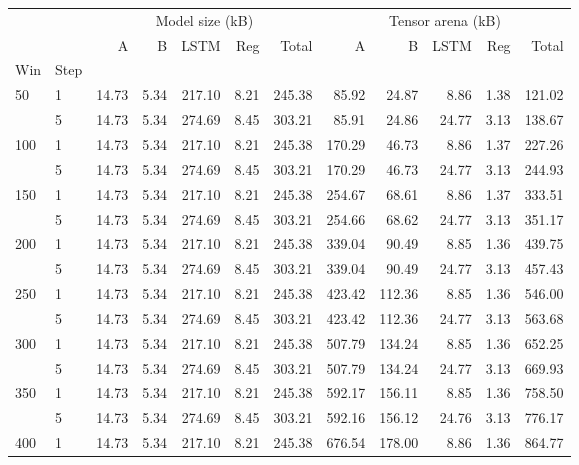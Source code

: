 \begin{tabular}{llrrrrrrrrrr}
\toprule
 &  & \multicolumn{5}{c}{Model size (kB)} & \multicolumn{5}{c}{Tensor arena (kB)} \\
 &  & A & B & LSTM & Reg & Total & A & B & LSTM & Reg & Total \\
Win & Step &  &  &  &  &  &  &  &  &  &  \\
\midrule
\multirow[t]{2}{*}{50} & 1 & 14.73 & 5.34 & 217.10 & 8.21 & 245.38 & 85.92 & 24.87 & 8.86 & 1.38 & 121.02 \\
 & 5 & 14.73 & 5.34 & 274.69 & 8.45 & 303.21 & 85.91 & 24.86 & 24.77 & 3.13 & 138.67 \\
\cline{1-12}
\multirow[t]{2}{*}{100} & 1 & 14.73 & 5.34 & 217.10 & 8.21 & 245.38 & 170.29 & 46.73 & 8.86 & 1.37 & 227.26 \\
 & 5 & 14.73 & 5.34 & 274.69 & 8.45 & 303.21 & 170.29 & 46.73 & 24.77 & 3.13 & 244.93 \\
\cline{1-12}
\multirow[t]{2}{*}{150} & 1 & 14.73 & 5.34 & 217.10 & 8.21 & 245.38 & 254.67 & 68.61 & 8.86 & 1.37 & 333.51 \\
 & 5 & 14.73 & 5.34 & 274.69 & 8.45 & 303.21 & 254.66 & 68.62 & 24.77 & 3.13 & 351.17 \\
\cline{1-12}
\multirow[t]{2}{*}{200} & 1 & 14.73 & 5.34 & 217.10 & 8.21 & 245.38 & 339.04 & 90.49 & 8.85 & 1.36 & 439.75 \\
 & 5 & 14.73 & 5.34 & 274.69 & 8.45 & 303.21 & 339.04 & 90.49 & 24.77 & 3.13 & 457.43 \\
\cline{1-12}
\multirow[t]{2}{*}{250} & 1 & 14.73 & 5.34 & 217.10 & 8.21 & 245.38 & 423.42 & 112.36 & 8.85 & 1.36 & 546.00 \\
 & 5 & 14.73 & 5.34 & 274.69 & 8.45 & 303.21 & 423.42 & 112.36 & 24.77 & 3.13 & 563.68 \\
\cline{1-12}
\multirow[t]{2}{*}{300} & 1 & 14.73 & 5.34 & 217.10 & 8.21 & 245.38 & 507.79 & 134.24 & 8.85 & 1.36 & 652.25 \\
 & 5 & 14.73 & 5.34 & 274.69 & 8.45 & 303.21 & 507.79 & 134.24 & 24.77 & 3.13 & 669.93 \\
\cline{1-12}
\multirow[t]{2}{*}{350} & 1 & 14.73 & 5.34 & 217.10 & 8.21 & 245.38 & 592.17 & 156.11 & 8.85 & 1.36 & 758.50 \\
 & 5 & 14.73 & 5.34 & 274.69 & 8.45 & 303.21 & 592.16 & 156.12 & 24.76 & 3.13 & 776.17 \\
\cline{1-12}
\multirow[t]{2}{*}{400} & 1 & 14.73 & 5.34 & 217.10 & 8.21 & 245.38 & 676.54 & 178.00 & 8.86 & 1.36 & 864.77 \\

\end{tabular}
